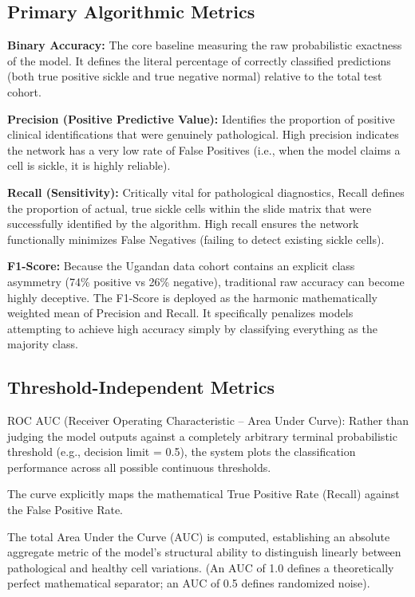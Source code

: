 \subsection{Primary Algorithmic Metrics}

\noindent\textbf{Binary Accuracy:} The core baseline measuring the raw probabilistic exactness of the model. It defines the literal percentage of correctly classified predictions (both true positive sickle and true negative normal) relative to the total test cohort.

\noindent\textbf{Precision (Positive Predictive Value):} Identifies the proportion of positive clinical identifications that were genuinely pathological. High precision indicates the network has a very low rate of False Positives (i.e., when the model claims a cell is sickle, it is highly reliable).

\noindent\textbf{Recall (Sensitivity):} Critically vital for pathological diagnostics, Recall defines the proportion of actual, true sickle cells within the slide matrix that were successfully identified by the algorithm. High recall ensures the network functionally minimizes False Negatives (failing to detect existing sickle cells).

\noindent\textbf{F1-Score:} Because the Ugandan data cohort contains an explicit class asymmetry (74\% positive vs 26\% negative), traditional raw accuracy can become highly deceptive. The F1-Score is deployed as the harmonic mathematically weighted mean of Precision and Recall. It specifically penalizes models attempting to achieve high accuracy simply by classifying everything as the majority class.

\subsection{Threshold-Independent Metrics}

ROC AUC (Receiver Operating Characteristic -- Area Under Curve): Rather than judging the model outputs against a completely arbitrary terminal probabilistic threshold (e.g., decision limit = 0.5), the system plots the classification performance across all possible continuous thresholds.

The curve explicitly maps the mathematical True Positive Rate (Recall) against the False Positive Rate.

The total Area Under the Curve (AUC) is computed, establishing an absolute aggregate metric of the model's structural ability to distinguish linearly between pathological and healthy cell variations. (An AUC of 1.0 defines a theoretically perfect mathematical separator; an AUC of 0.5 defines randomized noise).

